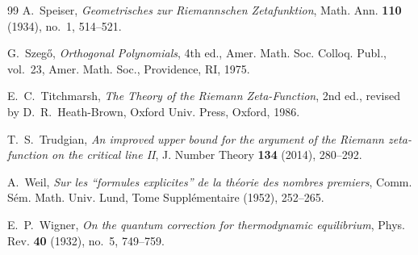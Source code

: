 \documentclass[11pt,reqno]{amsart}
\theoremstyle{definition}
\theoremstyle{remark}
\numberwithin{equation}{section}
\begin{document}
\begin{thebibliography}{99}
A.~Speiser,
\emph{Geometrisches zur Riemannschen Zetafunktion},
Math. Ann. \textbf{110} (1934), no.~1, 514--521.

G.~Szeg\H{o},
\emph{Orthogonal Polynomials},
4th ed., Amer. Math. Soc. Colloq. Publ., vol.~23, Amer. Math. Soc., Providence, RI, 1975.

E.~C.~Titchmarsh,
\emph{The Theory of the Riemann Zeta-Function},
2nd ed., revised by D.~R.~Heath-Brown, Oxford Univ. Press, Oxford, 1986.

T.~S.~Trudgian,
\emph{An improved upper bound for the argument of the Riemann zeta-function on the critical line II},
J. Number Theory \textbf{134} (2014), 280--292.

A.~Weil,
\emph{Sur les ``formules explicites'' de la th\'eorie des nombres premiers},
Comm. S\'em. Math. Univ. Lund, Tome Suppl\'ementaire (1952), 252--265.

E.~P.~Wigner,
\emph{On the quantum correction for thermodynamic equilibrium},
Phys. Rev. \textbf{40} (1932), no.~5, 749--759.

\end{thebibliography}
\end{document}
